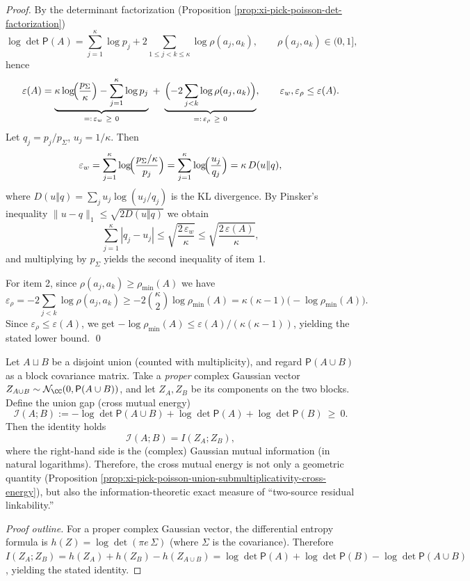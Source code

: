 \begin{proof}
By the determinant factorization (Proposition \ref{prop:xi-pick-poisson-det-factorization})
\[
\log\det\mathsf P(A)
=\sum_{j=1}^{\kappa}\log p_j+2\sum_{1\le j<k\le \kappa}\log\rho(a_j,a_k),
 \qquad \rho(a_j,a_k)\in(0,1],
\]
hence
\[
\varepsilon(A)
=\underbrace{\kappa\log\!\Bigl(\frac{p_{\Sigma}}{\kappa}\Bigr)-\sum_{j=1}^{\kappa}\log p_j}_{=:\,\varepsilon_w\ \ge\ 0}
\;+\;
\underbrace{\Bigl(-2\sum_{j<k}\log\rho(a_j,a_k)\Bigr)}_{=:\,\varepsilon_\rho\ \ge\ 0},
\qquad \varepsilon_w,\varepsilon_\rho\le \varepsilon(A).
\]
Let \(q_j=p_j/p_{\Sigma}\), \(u_j=1/\kappa\). Then
\[
\varepsilon_w=\sum_{j=1}^{\kappa}\log\!\Bigl(\frac{p_{\Sigma}/\kappa}{p_j}\Bigr)
=\sum_{j=1}^{\kappa}\log\!\Bigl(\frac{u_j}{q_j}\Bigr)
=\kappa\,D(u\Vert q),
\]
where \(D(u\Vert q)=\sum_j u_j\log(u_j/q_j)\) is the KL divergence. By Pinsker's inequality
\(\|u-q\|_1\le\sqrt{2D(u\Vert q)}\)
we obtain
\[
\sum_{j=1}^{\kappa}|q_j-u_j|
\le
\sqrt{\frac{2\,\varepsilon_w}{\kappa}}
\le
\sqrt{\frac{2\,\varepsilon(A)}{\kappa}},
\]
and multiplying by \(p_{\Sigma}\) yields the second inequality of item 1.
\par
For item 2, since \(\rho(a_j,a_k)\ge\rho_{\min}(A)\) we have
\[
\varepsilon_\rho
=-2\sum_{j<k}\log\rho(a_j,a_k)
\ge
-2\binom{\kappa}{2}\log\rho_{\min}(A)
=\kappa(\kappa-1)\bigl(-\log\rho_{\min}(A)\bigr).
\]
Since \(\varepsilon_\rho\le \varepsilon(A)\), we get
\(-\log\rho_{\min}(A)\le \varepsilon(A)/(\kappa(\kappa-1))\), yielding the stated lower bound. \qed
\end{proof}

\begin{proposition}\label{prop:xi-cross-energy-gaussian-mutual-information}
Let \(A\sqcup B\) be a disjoint union (counted with multiplicity), and regard \(\mathsf P(A\cup B)\) as a block covariance matrix.
Take a \emph{proper} complex Gaussian vector \(Z_{A\cup B}\sim\mathcal N_{\CC}(0,\mathsf P(A\cup B))\), and let \(Z_A,Z_B\) be its components on the two blocks.
Define the union gap (cross mutual energy)
\[
\mathcal I(A;B):=-\log\det\mathsf P(A\cup B)+\log\det\mathsf P(A)+\log\det\mathsf P(B)\ \ge\ 0.
\]
Then the identity holds
\[
\boxed{\;
\mathcal I(A;B)=I(Z_A;Z_B),\;}
\]
where the right-hand side is the (complex) Gaussian mutual information (in natural logarithms).
Therefore, the cross mutual energy is not only a geometric quantity (Proposition \ref{prop:xi-pick-poisson-union-submultiplicativity-cross-energy}), but also the information-theoretic exact measure of ``two-source residual linkability.''
\end{proposition}
\begin{proof}[Proof outline]
For a proper complex Gaussian vector, the differential entropy formula is \(h(Z)=\log\det(\pi e\,\Sigma)\) (where \(\Sigma\) is the covariance).
Therefore
\(
I(Z_A;Z_B)=h(Z_A)+h(Z_B)-h(Z_{A\cup B})
=\log\det\mathsf P(A)+\log\det\mathsf P(B)-\log\det\mathsf P(A\cup B)
\), yielding the stated identity. \qedhere
\end{proof}

